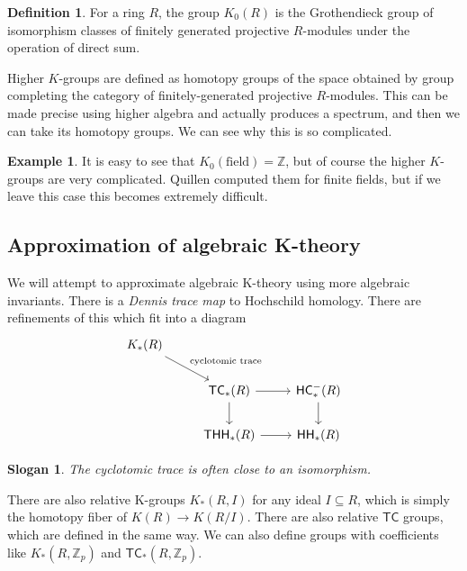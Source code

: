 \documentclass[10pt]{amsart}
\newtheorem{slog}[thm]{Slogan}
\theoremstyle{definition}
\newtheorem{defn}[thm]{Definition}
\newtheorem{exm}[thm]{Example}
\theoremstyle{remark}
\theoremstyle{plain}
\theoremstyle{definition}
\theoremstyle{remark}
\newcommand{\Z}{\mathbb{Z}}
\newcommand{\ms}[1]{\mathsf{#1}}
\newcommand{\1}{\mathbf{1}}
\newcommand{\2}{\mathbf{2}}
\newcommand{\3}{\mathbf{3}}
\newcommand{\HC}{\ms{HC}}
\newcommand{\THH}{\ms{THH}}
\newcommand{\TC}{\ms{TC}}
\newcommand{\HH}{\ms{HH}}
\begin{document}
\begin{defn}
    For a ring $R$, the group $K_0(R)$ is the Grothendieck group of isomorphism classes of finitely generated projective $R$-modules under the operation of direct sum.
\end{defn}

Higher $K$-groups are defined as homotopy groups of the space obtained by group completing the category of finitely-generated projective $R$-modules. This can be made precise using higher algebra and actually produces a spectrum, and then we can take its homotopy groups. We can see why this is so complicated. 

\begin{exm}
    It is easy to see that $K_0(\text{field}) = \Z$, but of course the higher $K$-groups are very complicated. Quillen computed them for finite fields, but if we leave this case this becomes extremely difficult. 
\end{exm}

\subsection{Approximation of algebraic K-theory}%
\label{sub:Approximation of algebraic K-theory}

We will attempt to approximate algebraic K-theory using more algebraic invariants. There is a \textit{Dennis trace map} to Hochschild homology. There are refinements of this which fit into a diagram
\begin{equation*}
\begin{tikzcd}
    K_*(R) \ar{dr}{\text{cyclotomic trace}} \\
    & \TC_*(R) \ar{r} \ar{d} & \HC_*^-(R) \ar{d} \\
    & \THH_*(R) \ar{r} & \HH_*(R)
\end{tikzcd}
\end{equation*}

\begin{slog}
    The cyclotomic trace is often close to an isomorphism.
\end{slog}

There are also relative K-groups $K_*(R, I)$ for any ideal $I \subseteq R$, which is simply the homotopy fiber of $K(R) \to K(R/I)$. There are also relative $\TC$ groups, which are defined in the same way. We can also define groups with coefficients like $K_*(R, \Z_p)$ and $\TC_*(R, \Z_p)$. 
\end{document}
